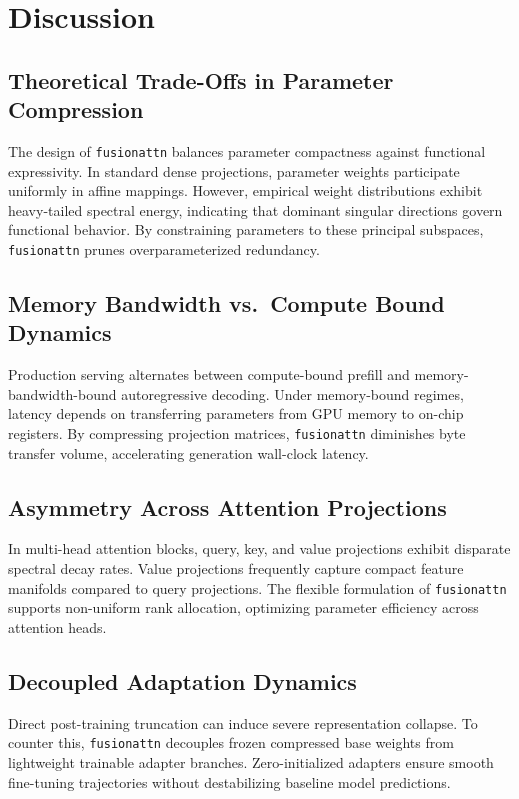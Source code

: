 \section{Discussion}

\subsection{Theoretical Trade-Offs in Parameter Compression}
The design of \texttt{fusionattn} balances parameter compactness against functional expressivity. In standard dense projections, parameter weights participate uniformly in affine mappings. However, empirical weight distributions exhibit heavy-tailed spectral energy, indicating that dominant singular directions govern functional behavior. By constraining parameters to these principal subspaces, \texttt{fusionattn} prunes overparameterized redundancy.

\subsection{Memory Bandwidth vs.\ Compute Bound Dynamics}
Production serving alternates between compute-bound prefill and memory-bandwidth-bound autoregressive decoding. Under memory-bound regimes, latency depends on transferring parameters from GPU memory to on-chip registers. By compressing projection matrices, \texttt{fusionattn} diminishes byte transfer volume, accelerating generation wall-clock latency.

\subsection{Asymmetry Across Attention Projections}
In multi-head attention blocks, query, key, and value projections exhibit disparate spectral decay rates. Value projections frequently capture compact feature manifolds compared to query projections. The flexible formulation of \texttt{fusionattn} supports non-uniform rank allocation, optimizing parameter efficiency across attention heads.

\subsection{Decoupled Adaptation Dynamics}
Direct post-training truncation can induce severe representation collapse. To counter this, \texttt{fusionattn} decouples frozen compressed base weights from lightweight trainable adapter branches. Zero-initialized adapters ensure smooth fine-tuning trajectories without destabilizing baseline model predictions.

